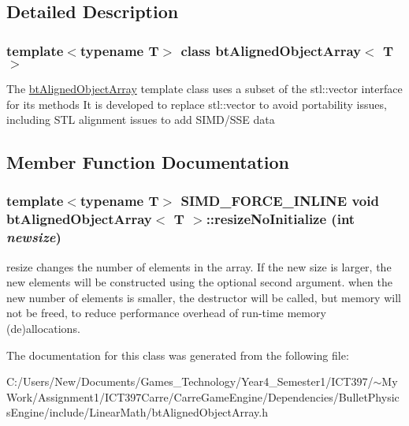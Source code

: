 \subsection{Detailed Description}
\subsubsection*{template$<$typename T$>$ class btAlignedObjectArray$<$ T $>$}

The \hyperlink{classbt_aligned_object_array}{btAlignedObjectArray} template class uses a subset of the stl::vector interface for its methods It is developed to replace stl::vector to avoid portability issues, including STL alignment issues to add SIMD/SSE data 

\subsection{Member Function Documentation}
\hypertarget{classbt_aligned_object_array_2cc58c74534181a7a10e5c6ab8b21227}{
\subsubsection[resizeNoInitialize]{\setlength{\rightskip}{0pt plus 5cm}template$<$typename T$>$ SIMD\_\-FORCE\_\-INLINE void {\bf btAlignedObjectArray}$<$ T $>$::resizeNoInitialize (int {\em newsize})}}
\label{classbt_aligned_object_array_2cc58c74534181a7a10e5c6ab8b21227}


resize changes the number of elements in the array. If the new size is larger, the new elements will be constructed using the optional second argument. when the new number of elements is smaller, the destructor will be called, but memory will not be freed, to reduce performance overhead of run-time memory (de)allocations. 

The documentation for this class was generated from the following file:\begin{CompactItemize}
\item 
C:/Users/New/Documents/Games\_\-Technology/Year4\_\-Semester1/ICT397/$\sim$My Work/Assignment1/ICT397Carre/CarreGameEngine/Dependencies/BulletPhysicsEngine/include/LinearMath/btAlignedObjectArray.h\end{CompactItemize}
